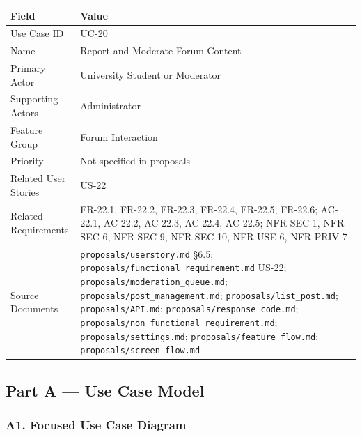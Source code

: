 \documentclass[12pt]{article}
\renewcommand{\baselinestretch}{1.5}
\begin{document}
\begingroup
\small
\renewcommand{\baselinestretch}{1.0}\selectfont
\renewcommand{\arraystretch}{1.15}
\setlength{\tabcolsep}{6pt}
\begin{longtable}{|>{\raggedright\arraybackslash}p{}|>{\raggedright\arraybackslash}p{}|}
\hline
\textbf{Field} & \textbf{Value} \\ \hline
\endhead
Use Case ID & UC-20 \\ \hline
Name & Report and Moderate Forum Content \\ \hline
Primary Actor & University Student or Moderator \\ \hline
Supporting Actors & Administrator \\ \hline
Feature Group & Forum Interaction \\ \hline
Priority & Not specified in proposals \\ \hline
Related User Stories & US-22 \\ \hline
Related Requirements & FR-22.1, FR-22.2, FR-22.3, FR-22.4, FR-22.5, FR-22.6; AC-22.1, AC-22.2, AC-22.3, AC-22.4, AC-22.5; NFR-SEC-1, NFR-SEC-6, NFR-SEC-9, NFR-SEC-10, NFR-USE-6, NFR-PRIV-7 \\ \hline
Source Documents & \texttt{proposals/userstory.md} §6.5; \texttt{proposals/functional\_requirement.md} US-22; \texttt{proposals/moderation\_queue.md}; \texttt{proposals/post\_management.md}; \texttt{proposals/list\_post.md}; \texttt{proposals/API.md}; \texttt{proposals/response\_code.md}; \texttt{proposals/non\_functional\_requirement.md}; \texttt{proposals/settings.md}; \texttt{proposals/feature\_flow.md}; \texttt{proposals/screen\_flow.md} \\ \hline
\end{longtable}
\endgroup
\par\medskip

\hypertarget{sec:part-a-use-case-model}{}
\subsection*{Part A --- Use Case Model}
\par\medskip

\hypertarget{sec:a1-focused-use-case-diagram}{}
\subsubsection*{A1. Focused Use Case Diagram}
\par\medskip
\end{document}
